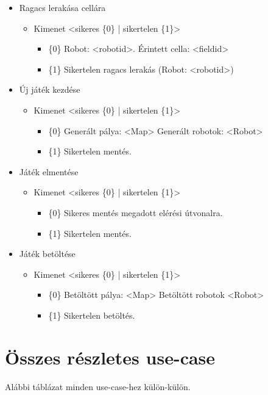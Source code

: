 \begin{itemize}
	\item Ragacs lerakása cellára
	\begin{itemize}
		\item Kimenet <sikeres \{0\} | sikertelen \{1\}>
		\begin{itemize}
			\item \{0\} Robot: <robotid>. Érintett cella: <fieldid>
			\item \{1\} Sikertelen ragacs lerakás (Robot: <robotid>)
		\end{itemize}
	\end{itemize}	
	
	\item Új játék kezdése
	\begin{itemize}
		\item Kimenet <sikeres \{0\} | sikertelen \{1\}>
		\begin{itemize}
			\item \{0\} Generált pálya: <Map> Generált robotok: <Robot>
			\item \{1\} Sikertelen mentés.
		\end{itemize}
	\end{itemize}
	
	
	\item Játék elmentése
	\begin{itemize}
		\item Kimenet <sikeres \{0\} | sikertelen \{1\}>
		\begin{itemize}
			\item \{0\} Sikeres mentés megadott elérési útvonalra. 
			\item \{1\} Sikertelen mentés.
		\end{itemize}
	\end{itemize}

	\item Játék betöltése
	\begin{itemize}
		\item Kimenet <sikeres \{0\} | sikertelen \{1\}>
		\begin{itemize}
			\item \{0\} Betöltött pálya: <Map> Betöltött robotok <Robot> 
			\item \{1\} Sikertelen betöltés.
		\end{itemize}
	\end{itemize}
	
\end{itemize}


\section{Összes részletes use-case}
Alábbi táblázat minden use-case-hez külön-külön.


